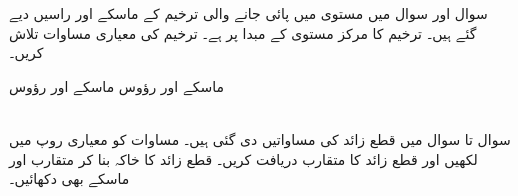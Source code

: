 سوال  اور سوال  میں مستوی   میں پائی  جانے والی   ترخیم کے ماسکے اور راسیں دیے  گئے ہیں۔ ترخیم کا مرکز  مستوی   کے مبدا پر ہے۔ ترخیم کی معیاری مساوات تلاش کریں۔

ماسکے  اور رؤوس 
ماسکے  اور رؤوس 

\\
سوال  تا سوال  میں قطع زائد کی مساواتیں دی گئی ہیں۔ مساوات کو معیاری روپ میں لکھیں اور قطع زائد کا متقارب دریافت کریں۔ قطع زائد کا خاکہ بنا کر متقارب اور ماسکے بھی دکھائیں۔ 

